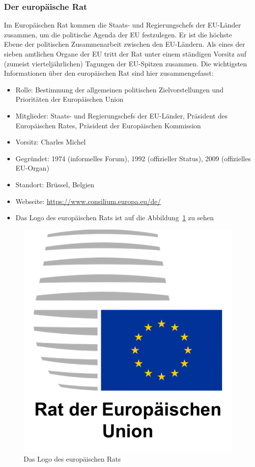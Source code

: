 \subsubsection{Der europäische Rat}\label{subsubsec:EuroRat}

Im Europäischen Rat kommen die Staats- und Regierungschefs der EU-Länder zusammen, um die politische Agenda der EU festzulegen. Er ist die höchste Ebene der politischen Zusammenarbeit zwischen den EU-Ländern.\newline
Als eines der sieben amtlichen Organe der EU tritt der Rat unter einem ständigen Vorsitz auf (zumeist vierteljährlichen) Tagungen der EU-Spitzen zusammen.\newline
Die wichtigsten Informationen über den europäischen Rat sind hier zusammengefasst:
\begin{itemize}
  \item Rolle: Bestimmung der allgemeinen politischen Zielvorstellungen und Prioritäten der Europäischen Union
  \item Mitglieder: Staats- und Regierungschefs der EU-Länder, Präsident des Europäischen Rates, Präsident der Europäischen Kommission
  \item Vorsitz: Charles Michel
  \item Gegründet: 1974 (informelles Forum), 1992 (offizieller Status), 2009 (offizielles EU-Organ)
    \item Standort: Brüssel, Belgien
    \item Webseite: \url{https://www.consilium.europa.eu/de/}
    \item Das Logo des europäischen Rats ist auf die Abbildung~\ref{fig:logoEuroRat} zu sehen
\end{itemize}

\begin{figure}[H]
\centering
    \includegraphics[width=.5\textwidth]{images/Euro_Rat.png}
    \caption{Das Logo des europäischen Rats}
    \label{fig:logoEuroRat}
\end{figure}

